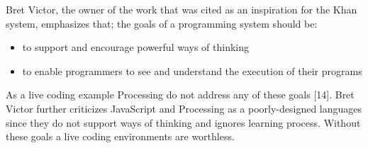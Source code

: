 Bret Victor, the owner of the work that was cited as an inspiration for the Khan system, emphasizes that; the goals of a programming system should be: 

\begin{itemize}

\item to support and encourage powerful ways of thinking
\item to enable programmers to see and understand the execution of their programs

\end{itemize}

As a live coding example Processing do not address any of these goals [14]. Bret Victor further criticizes JavaScript and Processing as a poorly-designed languages since they do not support ways of thinking and ignores learning process. Without these goals a live coding environments are worthless.
